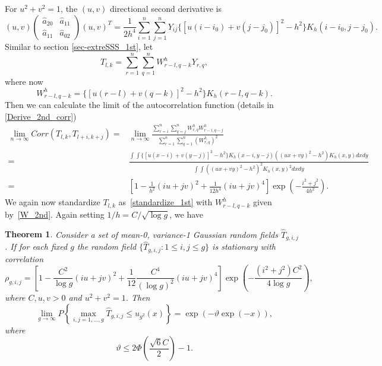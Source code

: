 \documentclass{article}
\def\ha{\hat{a}}
\newtheorem{theorem}{Theorem}%
\begin{document}
For $u^2+v^2=1$, the $(u,v)$ directional second derivative is
\begin{equation}
	\label{direct_2nd}
	(u,v)\left(
	\begin{matrix}
		\ha_{20}&\ha_{11}\\
		\ha_{11}&\ha_{02}
	\end{matrix}
	\right)(u,v)^T
	=\frac{1}{2h^4}\sum_{i=1}^n\sum_{j=1}^nY_{ij}\{[u(i-i_0)+v(j-j_0)]^2-h^2\}K_h(i-i_0,j-j_0).
\end{equation}
Similar to section \ref{sec-extreSSS_1st}, let
\begin{equation*}
	T_{l,k}=\sum_{r=1}^{n}\sum_{q=1}^{n}W^h_{r-l,q-k}Y_{r,q},
\end{equation*} 
where now
\begin{equation}
	\label{W_2nd}
	W^h_{r-l,q-k}=\{[u(r-l)+v(q-k)]^2-h^2\}K_{h}(r-l,q-k).
\end{equation}
Then we can calculate the limit of the autocorrelation function (details in \ref{Derive_2nd_corr})
\begin{equation}
	\label{eq_corr}
	\begin{aligned}
		\lim_{n \to \infty}Corr(T_{l,k},T_{l+i,k+j})=&\lim_{n \to \infty}\frac{\sum_{r=i}^{n}\sum_{q=j}^{n}W^h_{r,q}W^h_{r-i,q-j}}{\sum_{r=1}^{n}\sum_{q=1}^{n}(W^h_{r,q})^2}\\
		=&\frac{\int\int\{[u(x-i)+v(y-j)]^2-h^2\}K_{h}(x-i,y-j)((ux+vy)^2-h^2)K_{h}(x,y)dxdy}{\int\int((ux+vy)^2-h^2)^2K_{h}(x,y)^2dxdy}\\
		=&[1-\frac{1}{h^2}(iu+jv)^2+\frac{1}{12h^4}(iu+jv)^4]\exp(-\frac{i^2+j^2}{4h^2}).
	\end{aligned}
\end{equation}
We again now standardize $T_{l,k}$ as~\eqref{standardize_1st} with $W^h_{r-l,q-k}$ given by~\eqref{W_2nd}.
Again setting $1/h=C/\sqrt{\log g}$, we have 
\begin{theorem}
	\label{SSS_extreme}
	Consider a set of mean-0, variance-1 Gaussian random fields $\hat{T}_{g,i,j}$ . If for each fixed $g$ the random field $\{\hat{T}_{g,i,j}:1\leq i,j\leq g\}$  is stationary with correlation
	\begin{equation}
		\label{eq_corr_g_2nd}
		\rho_{g,i,j}=[1-\frac{C^2}{\log g}(iu+jv)^2+\frac{1}{12}\frac{C^4}{(\log g)^2}(iu+jv)^4]\exp(-\frac{(i^2+j^2)C^2}{4\log g}),
	\end{equation}
	where $C,u,v>0$ and $u^2+v^2=1$. Then
	\begin{equation*}
		\lim_{g\rightarrow\infty}P\left\{\max_{i,j=1,...,g}\hat{T}_{g,i,j}\leq u_{g^2}(x)\right\}=\exp(-\vartheta \exp(-x)),
	\end{equation*}
	where 
	\begin{equation}
		\label{eq-vartheta}
		\vartheta\leq2\Phi(\frac{\sqrt{6}C}{2})-1.
	\end{equation}
\end{theorem}
\end{document}
